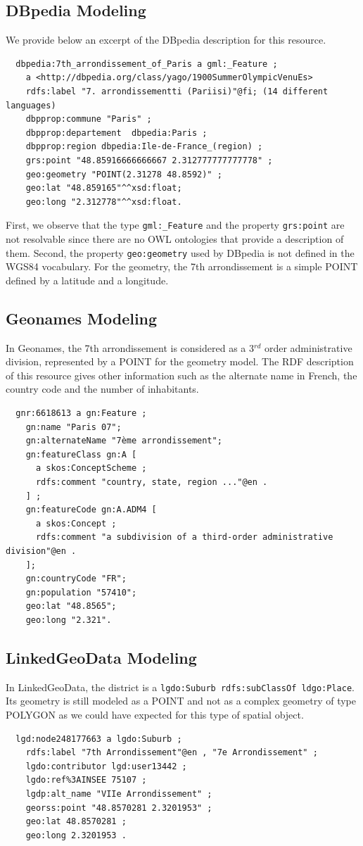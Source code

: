 \subsection{DBpedia Modeling}
We provide below an excerpt of the DBpedia description for this resource.
{\scriptsize
\begin{verbatim}
  dbpedia:7th_arrondissement_of_Paris a gml:_Feature ;
    a <http://dbpedia.org/class/yago/1900SummerOlympicVenuEs>
    rdfs:label "7. arrondissementti (Pariisi)"@fi; (14 different languages)
    dbpprop:commune "Paris" ;
    dbpprop:departement  dbpedia:Paris ;
    dbpprop:region dbpedia:Ile-de-France_(region) ;
    grs:point "48.85916666666667 2.312777777777778" ;
    geo:geometry "POINT(2.31278 48.8592)" ;
    geo:lat "48.859165"^^xsd:float;
    geo:long "2.312778"^^xsd:float.
\end{verbatim}
}
First, we observe that the type \texttt{gml:\_Feature} and the property \texttt{grs:point} are not resolvable since there are no OWL ontologies that provide a description of them. Second, the property \texttt{geo:geometry} used by DBpedia is not defined in the WGS84 vocabulary. For the geometry, the 7th arrondissement is a simple POINT defined by a latitude and a longitude.

\subsection{Geonames Modeling}
In Geonames, the 7th arrondissement is considered as a 3$^{rd}$ order administrative division, represented by a POINT for the geometry model. The RDF description of this resource gives other information such as the alternate name in French, the country code and the number of inhabitants.
{\scriptsize
\begin{verbatim}
  gnr:6618613 a gn:Feature ;
    gn:name "Paris 07";
    gn:alternateName "7ème arrondissement";
    gn:featureClass gn:A [
      a skos:ConceptScheme ;
      rdfs:comment "country, state, region ..."@en .
    ] ;
    gn:featureCode gn:A.ADM4 [
      a skos:Concept ;
      rdfs:comment "a subdivision of a third-order administrative division"@en .
    ];
    gn:countryCode "FR";
    gn:population "57410";
    geo:lat "48.8565";
    geo:long "2.321".
\end{verbatim}
}

\subsection{LinkedGeoData Modeling}
In LinkedGeoData, the district is a \texttt{lgdo:Suburb rdfs:subClassOf ldgo:Place}. Its geometry is still modeled as a POINT and not as a complex geometry of type POLYGON as we could have expected for this type of spatial object.
{\scriptsize
\begin{verbatim}
  lgd:node248177663 a lgdo:Suburb ;
    rdfs:label "7th Arrondissement"@en , "7e Arrondissement" ;
    lgdo:contributor lgd:user13442 ;
    lgdo:ref%3AINSEE 75107 ;
    lgdp:alt_name "VIIe Arrondissement" ;
    georss:point "48.8570281 2.3201953" ;
    geo:lat 48.8570281 ;
    geo:long 2.3201953 .
\end{verbatim}
}

